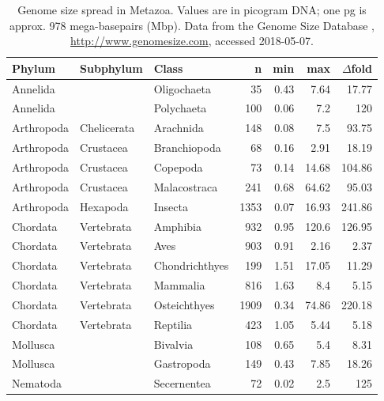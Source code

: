 \begin{table}[t]
\centering\footnotesize
\caption[Genome size spread in Metazoa]{Genome size spread in Metazoa.
Values are in picogram DNA; one pg is approx. 978 mega-basepairs (Mbp).
Data from the Genome Size Database \citep{Gregory2018},
\url{http://www.genomesize.com}, accessed 2018-05-07.}
\label{tab:genome-size-spread}
\begin{tabular}{@{}lllrrrr@{}}
\toprule
Phylum     & Subphylum   & Class          & n    & min  & max   & $\Delta$fold \\
\midrule
Annelida   &             & Oligochaeta    & 35   & 0.43 & 7.64  & 17.77  \\
Annelida   &             & Polychaeta     & 100  & 0.06 & 7.2   & 120    \\
Arthropoda & Chelicerata & Arachnida      & 148  & 0.08 & 7.5   & 93.75  \\
Arthropoda & Crustacea   & Branchiopoda   & 68   & 0.16 & 2.91  & 18.19  \\
Arthropoda & Crustacea   & Copepoda       & 73   & 0.14 & 14.68 & 104.86 \\
Arthropoda & Crustacea   & Malacostraca   & 241  & 0.68 & 64.62 & 95.03  \\
Arthropoda & Hexapoda    & Insecta        & 1353 & 0.07 & 16.93 & 241.86 \\
Chordata   & Vertebrata  & Amphibia       & 932  & 0.95 & 120.6 & 126.95 \\
Chordata   & Vertebrata  & Aves           & 903  & 0.91 & 2.16  & 2.37   \\
Chordata   & Vertebrata  & Chondrichthyes & 199  & 1.51 & 17.05 & 11.29  \\
Chordata   & Vertebrata  & Mammalia       & 816  & 1.63 & 8.4   & 5.15   \\
Chordata   & Vertebrata  & Osteichthyes   & 1909 & 0.34 & 74.86 & 220.18 \\
Chordata   & Vertebrata  & Reptilia       & 423  & 1.05 & 5.44  & 5.18   \\
Mollusca   &             & Bivalvia       & 108  & 0.65 & 5.4   & 8.31   \\
Mollusca   &             & Gastropoda     & 149  & 0.43 & 7.85  & 18.26  \\
Nematoda   &             & Secernentea    & 72   & 0.02 & 2.5   & 125    \\
\bottomrule
\end{tabular}
\end{table}

